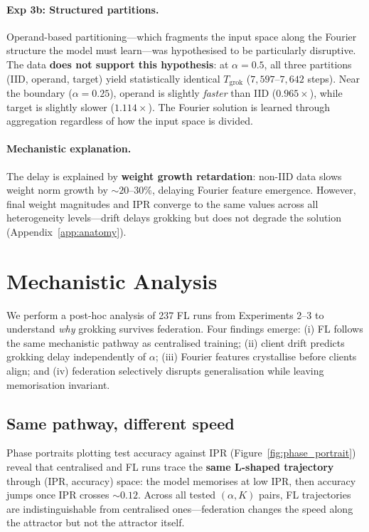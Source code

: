 \documentclass{article}
\begin{document}
\paragraph{Exp 3b: Structured partitions.}
Operand-based partitioning---which fragments the input space along the Fourier structure the model must learn---was hypothesised to be particularly disruptive.
The data \textbf{does not support this hypothesis}: at $\alpha = 0.5$, all three partitions (IID, operand, target) yield statistically identical $T_{\mathrm{grok}}$ ($7{,}597$--$7{,}642$ steps).
Near the boundary ($\alpha = 0.25$), operand is slightly \emph{faster} than IID ($0.965\times$), while target is slightly slower ($1.114\times$).
The Fourier solution is learned through aggregation regardless of how the input space is divided.

\paragraph{Mechanistic explanation.}
The delay is explained by \textbf{weight growth retardation}: non-IID data slows weight norm growth by ${\sim}20$--$30\%$, delaying Fourier feature emergence.
However, final weight magnitudes and IPR converge to the same values across all heterogeneity levels---drift delays grokking but does not degrade the solution (Appendix~\ref{app:anatomy}).


\section{Mechanistic Analysis}
\label{sec:mechanistic}

We perform a post-hoc analysis of 237 FL runs from Experiments 2--3 to understand \emph{why} grokking survives federation.
Four findings emerge: (i) FL follows the same mechanistic pathway as centralised training; (ii) client drift predicts grokking delay independently of $\alpha$; (iii) Fourier features crystallise before clients align; and (iv) federation selectively disrupts generalisation while leaving memorisation invariant.

\subsection{Same pathway, different speed}
\label{sec:mech_pathway}

Phase portraits plotting test accuracy against IPR (Figure~\ref{fig:phase_portrait}) reveal that centralised and FL runs trace the \textbf{same L-shaped trajectory} through (IPR, accuracy) space: the model memorises at low IPR, then accuracy jumps once IPR crosses ${\sim}0.12$.
Across all tested $(\alpha, K)$ pairs, FL trajectories are indistinguishable from centralised ones---federation changes the speed along the attractor but not the attractor itself.
\end{document}
